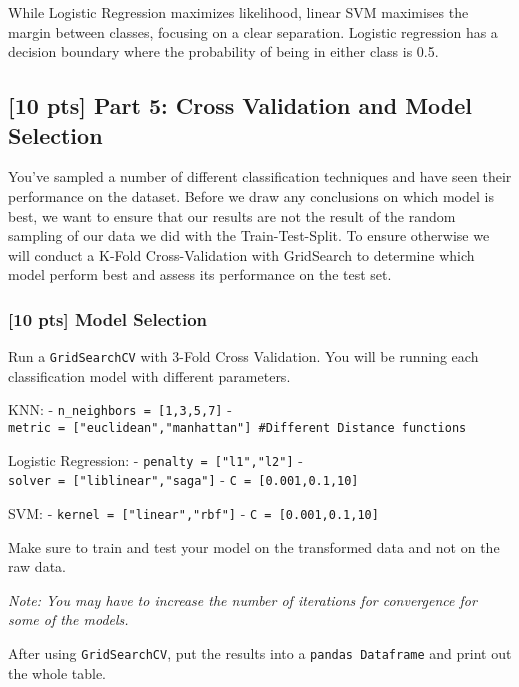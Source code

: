\documentclass[11pt]{article}
\begin{document}
While Logistic Regression maximizes likelihood, linear SVM maximises the
margin between classes, focusing on a clear separation. Logistic
regression has a decision boundary where the probability of being in
either class is 0.5.

    \hypertarget{pts-part-5-cross-validation-and-model-selection}{%
\subsection{{[}10 pts{]} Part 5: Cross Validation and Model
Selection}\label{pts-part-5-cross-validation-and-model-selection}}

    You've sampled a number of different classification techniques and have
seen their performance on the dataset. Before we draw any conclusions on
which model is best, we want to ensure that our results are not the
result of the random sampling of our data we did with the
Train-Test-Split. To ensure otherwise we will conduct a K-Fold
Cross-Validation with GridSearch to determine which model perform best
and assess its performance on the test set.

    \hypertarget{pts-model-selection}{%
\subsubsection{{[}10 pts{]} Model Selection}\label{pts-model-selection}}

Run a \texttt{GridSearchCV} with 3-Fold Cross Validation. You will be
running each classification model with different parameters.

KNN: - \texttt{n\_neighbors\ =\ {[}1,3,5,7{]}} -
\texttt{metric\ =\ {[}"euclidean","manhattan"{]}\ \#Different\ Distance\ functions}

Logistic Regression: - \texttt{penalty\ =\ {[}"l1","l2"{]}} -
\texttt{solver\ =\ {[}"liblinear","saga"{]}} -
\texttt{C\ =\ {[}0.001,0.1,10{]}}

SVM: - \texttt{kernel\ =\ {[}"linear","rbf"{]}} -
\texttt{C\ =\ {[}0.001,0.1,10{]}}

Make sure to train and test your model on the transformed data and not
on the raw data.

\emph{Note: You may have to increase the number of iterations for
convergence for some of the models.}

After using \texttt{GridSearchCV}, put the results into a
\texttt{pandas\ Dataframe} and print out the whole table.
\end{document}
